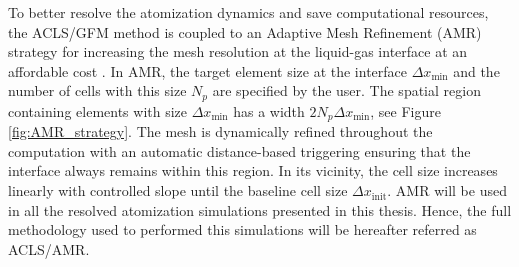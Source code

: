 To better resolve the atomization dynamics and save computational resources, the ACLS/GFM method is coupled to an Adaptive Mesh Refinement (AMR) strategy for increasing the mesh resolution at the liquid-gas interface at an affordable cost . In AMR, the target element size at the interface $\Delta x_\mathrm{min}$ and  the number of cells with this size $N_p$ are specified by the user. The spatial region containing elements with size $\Delta x_\mathrm{min}$ has a width $2 N_p\Delta x_\mathrm{min}$, see Figure \ref{fig:AMR_strategy}. The mesh is dynamically refined throughout the computation with an automatic distance-based triggering ensuring that the interface always remains within this region. In its vicinity, the cell size increases linearly with controlled slope until the baseline cell size $\Delta x_\mathrm{init}$. AMR will be used in all the resolved atomization simulations presented in this thesis. Hence, the full methodology used to performed this simulations will be hereafter referred as ACLS/AMR.

